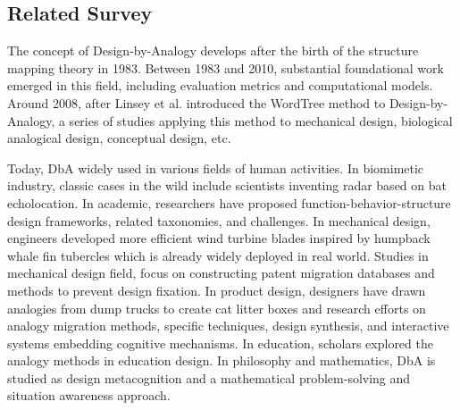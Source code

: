 








\subsection{Related Survey}

The concept of Design-by-Analogy develops after the birth of the structure mapping theory in 1983\cite{gentner1983structure}. Between 1983 and 2010, substantial foundational work emerged in this field, including evaluation metrics\cite{mcadams2002quantitative} and computational models\cite{french2002computational, gentner2011computational, falkenhainer1989structure, thagard1990analog, hummel1997distributed, hofstadter1984copycat}. Around 2008, after Linsey et al. introduced the WordTree method to Design-by-Analogy\cite{linsey2008increasing}, a series of studies applying this method to mechanical design\cite{fu2015design}, biological analogical design\cite{fu2014bio}, conceptual design\cite{moreno2016overcoming}, etc.


Today, DbA widely used in various fields of human activities. In biomimetic industry, classic cases in the wild include scientists inventing radar based on bat echolocation\cite{fu2014bio}. In academic, researchers have proposed function-behavior-structure design frameworks\cite{helms2009biologically}, related taxonomies\cite{fu2014bio}, and challenges\cite{nagel2018establishing, linsey2013overcoming}. In mechanical design, engineers developed more efficient wind turbine blades inspired by humpback whale fin tubercles which is already widely deployed in real world\cite{linsey2008increasing}. Studies in mechanical design field, focus on constructing patent migration databases\cite{fu2015design} and methods to prevent design fixation\cite{atilola2015representing, marshall2016analogy}. In product design, designers have drawn analogies from dump trucks to create cat litter boxes\cite{linsey2012design} and research efforts on analogy migration methods\cite{barnett2002and}, specific techniques\cite{ghane2024semantic,liu2023smfm, regenwetter2022deep, ghane2024semantic,}, design synthesis\cite{chakrabarti2011computer}, and interactive systems embedding cognitive mechanisms\cite{goel2012cognitive}. In education, scholars explored the analogy methods in education design\cite{duit1991role}. In philosophy and mathematics, DbA is studied as design metacognition\cite{ball2019advancing, holyoak1996mental} and a mathematical problem-solving and situation awareness approach\cite{polya2020mathematics}.

